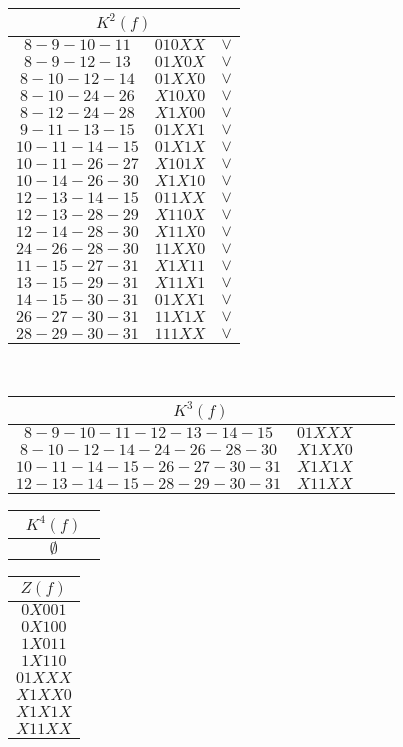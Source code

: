 \documentclass[12pt,a4paper]{report}
\begin{document}
\begin{tabular}{|ccc|}
    \hline
    \multicolumn{3}{|c|}{$K^2(f)$}\\
    \hline
    $8-9-10-11$ & $010XX$ & $\vee$\\
    $8-9-12-13$ & $01X0X$ & $\vee$\\
    $8-10-12-14$ & $01XX0$ & $\vee$\\
    $8-10-24-26$ & $X10X0$ & $\vee$\\
    $8-12-24-28$ & $X1X00$ & $\vee$\\
    \hline
    $9-11-13-15$ & $01XX1$ & $\vee$\\
    $10-11-14-15$ & $01X1X$ & $\vee$\\
    $10-11-26-27$ & $X101X$ & $\vee$\\
    $10-14-26-30$ & $X1X10$ & $\vee$\\
    $12-13-14-15$ & $011XX$ & $\vee$\\
    $12-13-28-29$ & $X110X$ & $\vee$\\
    $12-14-28-30$ & $X11X0$ & $\vee$\\
    $24-26-28-30$ & $11XX0$ & $\vee$\\
    \hline
    $11-15-27-31$ & $X1X11$ & $\vee$\\
    $13-15-29-31$ & $X11X1$ & $\vee$\\
    $14-15-30-31$ & $01XX1$ & $\vee$\\
    $26-27-30-31$ & $11X1X$ & $\vee$\\
    $28-29-30-31$ & $111XX$ & $\vee$\\
    \hline
\end{tabular}\\
\begin{tabular}{|ccc|}
    \hline
    \multicolumn{3}{|c|}{$K^3(f)$}\\
    \hline
    $8-9-10-11-12-13-14-15$ & $01XXX$ & $\phantom{\vee}$\\
    $8-10-12-14-24-26-28-30$ & $X1XX0$ & $\phantom{\vee}$\\
    \hline
    $10-11-14-15-26-27-30-31$ & $X1X1X$ & $\phantom{\vee}$\\
    $12-13-14-15-28-29-30-31$ & $X11XX$ & $\phantom{\vee}$\\
    \hline
\end{tabular}
\begin{tabular}{|ccc|}
    \hline
    \multicolumn{3}{|c|}{$K^4(f)$}\\
    \hline
    $\phantom{\vee}$ & $\emptyset$ & $\phantom{\vee}$\\
    \hline
\end{tabular}
\begin{tabular}{|c|}
    \hline
    $Z(f)$\\
    \hline
    $0X001$\\
    $0X100$\\
    $1X011$\\
    $1X110$\\
    $01XXX$\\
    $X1XX0$\\
    $X1X1X$\\
    $X11XX$\\
    \hline
\end{tabular}
\pagebreak
\end{document}
